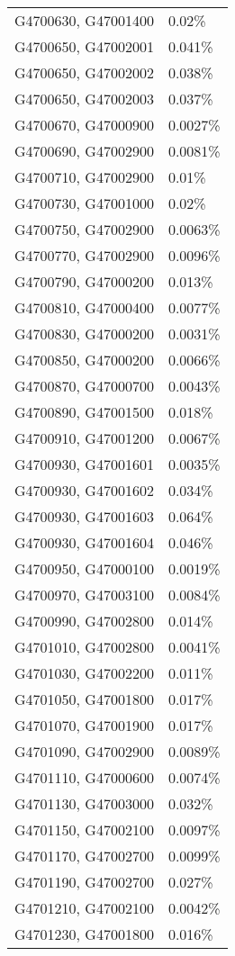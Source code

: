 \begin{longtable}[]{@{}ll@{}}
G4700630, G47001400 & 0.02\% \\
G4700650, G47002001 & 0.041\% \\
G4700650, G47002002 & 0.038\% \\
G4700650, G47002003 & 0.037\% \\
G4700670, G47000900 & 0.0027\% \\
G4700690, G47002900 & 0.0081\% \\
G4700710, G47002900 & 0.01\% \\
G4700730, G47001000 & 0.02\% \\
G4700750, G47002900 & 0.0063\% \\
G4700770, G47002900 & 0.0096\% \\
G4700790, G47000200 & 0.013\% \\
G4700810, G47000400 & 0.0077\% \\
G4700830, G47000200 & 0.0031\% \\
G4700850, G47000200 & 0.0066\% \\
G4700870, G47000700 & 0.0043\% \\
G4700890, G47001500 & 0.018\% \\
G4700910, G47001200 & 0.0067\% \\
G4700930, G47001601 & 0.0035\% \\
G4700930, G47001602 & 0.034\% \\
G4700930, G47001603 & 0.064\% \\
G4700930, G47001604 & 0.046\% \\
G4700950, G47000100 & 0.0019\% \\
G4700970, G47003100 & 0.0084\% \\
G4700990, G47002800 & 0.014\% \\
G4701010, G47002800 & 0.0041\% \\
G4701030, G47002200 & 0.011\% \\
G4701050, G47001800 & 0.017\% \\
G4701070, G47001900 & 0.017\% \\
G4701090, G47002900 & 0.0089\% \\
G4701110, G47000600 & 0.0074\% \\
G4701130, G47003000 & 0.032\% \\
G4701150, G47002100 & 0.0097\% \\
G4701170, G47002700 & 0.0099\% \\
G4701190, G47002700 & 0.027\% \\
G4701210, G47002100 & 0.0042\% \\
G4701230, G47001800 & 0.016\% \\

\end{longtable}
